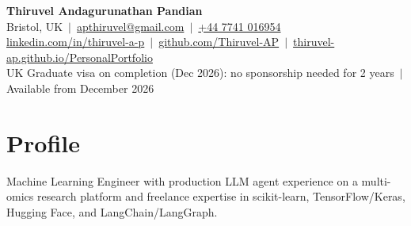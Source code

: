 \documentclass[a4paper,10pt]{article}
\begin{document}
\fontsize{10.5}{12.6}\selectfont

\begin{center}
  {\LARGE\bfseries Thiruvel Andagurunathan Pandian}\\[3pt]
  Bristol, UK \,$|$\, \href{mailto:apthiruvel@gmail.com}{apthiruvel@gmail.com} \,$|$\, \href{tel:+447741016954}{+44 7741 016954}\\[1pt]
\href{https://www.linkedin.com/in/thiruvel-a-p/}{linkedin.com/in/thiruvel-a-p} \,$|$\, \href{https://github.com/Thiruvel-AP}{github.com/Thiruvel-AP} \,$|$\, \href{https://thiruvel-ap.github.io/PersonalPortfolio/}{thiruvel-ap.github.io/PersonalPortfolio}\\[1pt]
  UK Graduate visa on completion (Dec 2026): no sponsorship needed for 2 years \,$|$\, Available from December 2026
\end{center}

\section{Profile}
Machine Learning Engineer with production LLM agent experience on a multi-omics research platform and freelance expertise in scikit-learn, TensorFlow/Keras, Hugging Face, and LangChain/LangGraph.

\end{document}
